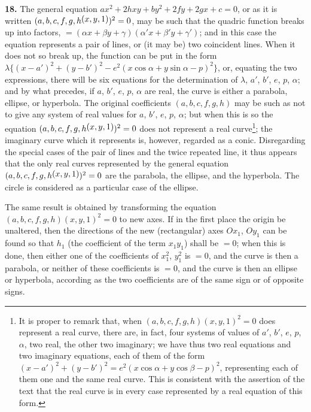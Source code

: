 \documentclass[11pt,a4paper]{article}
\theoremstyle{definition}
\begin{document}
\textbf{18.} The general equation $ax^2+2hxy+by^2+2fy+2gx+c=0$, or as it is written $(a,b,c,f,g,h\,\raisebox{0.5ex}{\text{$\!(x,y,1)$}})^2=0$, may be such that the quadric function breaks up into factors, $=(\alpha x+\beta y+\gamma)(\alpha' x+\beta' y+\gamma')$; and in this case the equation represents a pair of lines, or (it may be) two coincident lines. When it does not so break up, the function can be put in the form $\lambda\{(x-a')^2+(y-b')^2-e^2(x\cos\alpha+y\sin\alpha-p)^2\}$, or, equating the two expressions, there will be six equations for the determination of $\lambda$, $a'$, $b'$, $e$, $p$, $\alpha$; and by what precedes, if $a$, $b'$, $e$, $p$, $\alpha$ are real, the curve is either a parabola, ellipse, or hyperbola. The original coefficients $(a,b,c,f,g,h)$ may be such as not to give any system of real values for $a$, $b'$, $e$, $p$, $\alpha$; but when this is so the equation $(a,b,c,f,g,h\,\raisebox{0.5ex}{\text{$\!(x,y,1)$}})^2=0$ does not represent a real curve\footnote{It is proper to remark that, when $(a,b,c,f,g,h)(x,y,1)^2=0$ does represent a real curve, there are, in fact, four systems of values of $a'$, $b'$, $e$, $p$, $\alpha$, two real, the other two imaginary; we have thus two real equations and two imaginary equations, each of them of the form $(x-a')^2+(y-b')^2=e^2(x\cos\alpha+y\cos\beta-p)^2$, representing each of them one and the same real curve. This is consistent with the assertion of the text that the real curve is in every case represented by a real equation of this form.}; the imaginary curve which it represents is, however, regarded as a conic. Disregarding the special cases of the pair of lines and the twice repeated line, it thus appears that the only real curves represented by the general equation $(a,b,c,f,g,h\,\raisebox{0.5ex}{\text{$\!(x,y,1)$}})^2=0$ are the parabola, the ellipse, and the hyperbola. The circle is considered as a particular case of the ellipse.

The same result is obtained by transforming the equation $(a,b,c,f,g,h)(x,y,1)^2=0$ to new axes. If in the first place the origin be unaltered, then the directions of the new (rectangular) axes $Ox_1$, $Oy_1$ can be found so that $h_1$ (the coefficient of the term $x_1y_1$) shall be $=0$; when this is done, then either one of the coefficients of $x_1^2$, $y_1^2$ is $=0$, and the curve is then a parabola, or neither of these coefficients is $=0$, and the curve is then an ellipse or hyperbola, according as the two coefficients are of the same sign or of opposite signs.
\end{document}
